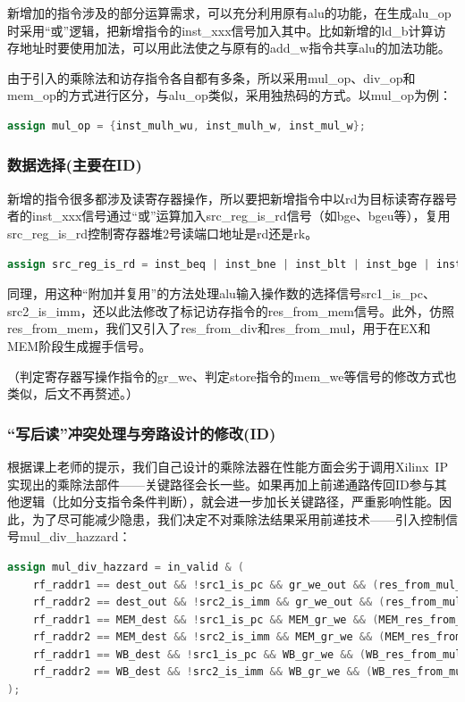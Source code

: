\documentclass[11pt]{article}
\begin{document}
新增加的指令涉及的部分运算需求，可以充分利用原有alu的功能，在生成alu_op时采用“或”逻辑，把新增指令的inst_xxx信号加入其中。比如新增的ld_b计算访存地址时要使用加法，可以用此法使之与原有的add_w指令共享alu的加法功能。

由于引入的乘除法和访存指令各自都有多条，所以采用mul_op、div_op和mem_op的方式进行区分，与alu_op类似，采用独热码的方式。以mul_op为例：
\begin{lstlisting}[language=Verilog, caption={mul_op(独热码)}]
assign mul_op = {inst_mulh_wu, inst_mulh_w, inst_mul_w};
\end{lstlisting}


\subsubsection{数据选择(主要在ID)}

新增的指令很多都涉及读寄存器操作，所以要把新增指令中以rd为目标读寄存器号者的inst_xxx信号通过“或”运算加入src_reg_is_rd信号（如bge、bgeu等），复用src_reg_is_rd控制寄存器堆2号读端口地址是rd还是rk。
\begin{lstlisting}[language=Verilog, caption={src\_reg\_is\_rd信号}]
assign src_reg_is_rd = inst_beq | inst_bne | inst_blt | inst_bge | inst_bltu | inst_bgeu | inst_st_b | inst_st_h | inst_st_w;
\end{lstlisting}

同理，用这种“附加并复用”的方法处理alu输入操作数的选择信号src1_is_pc、src2_is_imm，还以此法修改了标记访存指令的res_from_mem信号。此外，仿照res_from_mem，我们又引入了res_from_div和res_from_mul，用于在EX和MEM阶段生成握手信号。

（判定寄存器写操作指令的gr_we、判定store指令的mem_we等信号的修改方式也类似，后文不再赘述。）

\subsubsection{“写后读”冲突处理与旁路设计的修改(ID)}

根据课上老师的提示，我们自己设计的乘除法器在性能方面会劣于调用Xilinx\ IP实现出的乘除法部件——关键路径会长一些。如果再加上前递通路传回ID参与其他逻辑（比如分支指令条件判断），就会进一步加长关键路径，严重影响性能。因此，为了尽可能减少隐患，我们决定不对乘除法结果采用前递技术——引入控制信号mul_div_hazzard：

\begin{lstlisting}[language=Verilog, caption={mul_div_hazzard信号}]
assign mul_div_hazzard = in_valid & (
    rf_raddr1 == dest_out && !src1_is_pc && gr_we_out && (res_from_mul_out || res_from_div_out) && out_valid ||
    rf_raddr2 == dest_out && !src2_is_imm && gr_we_out && (res_from_mul_out || res_from_div_out) && out_valid ||
    rf_raddr1 == MEM_dest && !src1_is_pc && MEM_gr_we && (MEM_res_from_mul || MEM_res_from_div) && MEM_valid ||
    rf_raddr2 == MEM_dest && !src2_is_imm && MEM_gr_we && (MEM_res_from_mul || MEM_res_from_div) && MEM_valid ||
    rf_raddr1 == WB_dest && !src1_is_pc && WB_gr_we && (WB_res_from_mul || WB_res_from_div) && WB_valid ||
    rf_raddr2 == WB_dest && !src2_is_imm && WB_gr_we && (WB_res_from_mul || WB_res_from_div) && WB_valid
);
\end{lstlisting}
\end{document}

